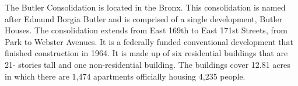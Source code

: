 The Butler Consolidation is located in the Bronx. This consolidation is named after Edmund Borgia Butler and is comprised of a single development, Butler Houses. The consolidation extends from East 169th to East 171st Streets, from Park to Webster Avenues. It is a federally funded conventional development that finished construction in 1964. It is made up of six residential buildings that are 21- stories tall and one non-residential building. The buildings cover 12.81 acres in which there are 1,474 apartments officially housing 4,235 people.